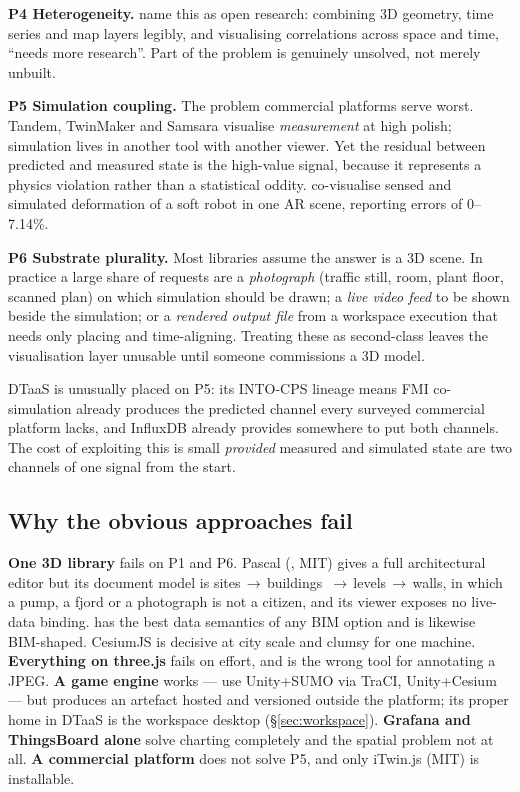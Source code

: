 \textbf{P4 Heterogeneity.} \citet{ali2024spatial} name this as open research: combining
3D geometry, time series and map layers legibly, and visualising correlations across
space and time, ``needs more research''. Part of the problem is genuinely unsolved, not
merely unbuilt.

\textbf{P5 Simulation coupling.} The problem commercial platforms serve worst. Tandem,
TwinMaker and Samsara visualise \emph{measurement} at high polish; simulation lives in
another tool with another viewer. Yet the residual between predicted and measured state
is the high-value signal, because it represents a physics violation rather than a
statistical oddity. \citet{liao2025digital} co-visualise sensed and simulated
deformation of a soft robot in one AR scene, reporting errors of 0--7.14\%.

\textbf{P6 Substrate plurality.} Most libraries assume the answer is a 3D scene. In
practice a large share of requests are a \emph{photograph} (traffic still, room, plant
floor, scanned plan) on which simulation should be drawn; a \emph{live video feed} to be
shown beside the simulation; or a \emph{rendered output file} from a workspace execution
that needs only placing and time-aligning. Treating these as second-class leaves the
visualisation layer unusable until someone commissions a 3D model.

\begin{keypoint}
DTaaS is unusually placed on P5: its INTO-CPS lineage means FMI co-simulation already
produces the predicted channel every surveyed commercial platform lacks, and InfluxDB
already provides somewhere to put both channels. The cost of exploiting this is small
\emph{provided} measured and simulated state are two channels of one signal from the
start.
\end{keypoint}

\subsection{Why the obvious approaches fail}

\textbf{One 3D library} fails on P1 and P6. Pascal (, MIT) gives a
full architectural editor but its document model is sites\,$\rightarrow$\,buildings\,%
$\rightarrow$\,levels\,$\rightarrow$\,walls, in which a pump, a fjord or a photograph is
not a citizen, and its viewer exposes no live-data binding. 
has the best data semantics of any BIM option and is likewise BIM-shaped. CesiumJS is
decisive at city scale and clumsy for one machine. \textbf{Everything on three.js} fails
on effort, and is the wrong tool for annotating a JPEG. \textbf{A game engine} works ---
\citet{rundel2023leveraging} use Unity+SUMO via TraCI, \citet{vasilijevic2024trondheim}
Unity+Cesium --- but produces an artefact hosted and versioned outside the platform; its
proper home in DTaaS is the workspace desktop (\S\ref{sec:workspace}).
\textbf{Grafana and ThingsBoard alone} solve charting completely and the spatial problem
not at all. \textbf{A commercial platform} does not solve P5, and only iTwin.js (MIT) is
installable.

